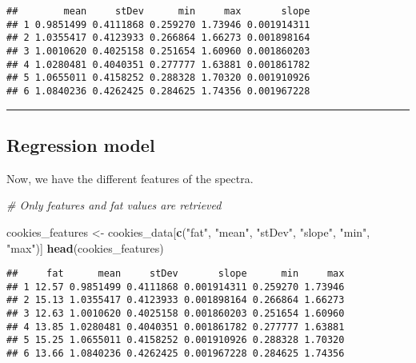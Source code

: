 \documentclass[
]{article}
\newenvironment{Shaded}{\begin{snugshade}}{\end{snugshade}}
\newcommand{\CommentTok}[1]{\textcolor[rgb]{0.56,0.35,0.01}{\textit{#1}}}
\newcommand{\DecValTok}[1]{\textcolor[rgb]{0.00,0.00,0.81}{#1}}
\newcommand{\FunctionTok}[1]{\textcolor[rgb]{0.13,0.29,0.53}{\textbf{#1}}}
\newcommand{\NormalTok}[1]{#1}
\newcommand{\OtherTok}[1]{\textcolor[rgb]{0.56,0.35,0.01}{#1}}
\newcommand{\SpecialCharTok}[1]{\textcolor[rgb]{0.81,0.36,0.00}{\textbf{#1}}}
\newcommand{\StringTok}[1]{\textcolor[rgb]{0.31,0.60,0.02}{#1}}
\begin{document}
\begin{verbatim}
##        mean     stDev      min     max       slope
## 1 0.9851499 0.4111868 0.259270 1.73946 0.001914311
## 2 1.0355417 0.4123933 0.266864 1.66273 0.001898164
## 3 1.0010620 0.4025158 0.251654 1.60960 0.001860203
## 4 1.0280481 0.4040351 0.277777 1.63881 0.001861782
## 5 1.0655011 0.4158252 0.288328 1.70320 0.001910926
## 6 1.0840236 0.4262425 0.284625 1.74356 0.001967228
\end{verbatim}

\begin{center}\rule{0.5\linewidth}{0.5pt}\end{center}

\subsection{Regression model}\label{regression-model}

Now, we have the different features of the spectra.

\begin{Shaded}
\begin{Highlighting}[]
\CommentTok{\# Only features and fat values are retrieved}

\NormalTok{cookies\_features }\OtherTok{\textless{}{-}}\NormalTok{ cookies\_data[}\FunctionTok{c}\NormalTok{(}\StringTok{"fat"}\NormalTok{, }\StringTok{"mean"}\NormalTok{, }\StringTok{"stDev"}\NormalTok{, }\StringTok{"slope"}\NormalTok{, }\StringTok{"min"}\NormalTok{, }\StringTok{"max"}\NormalTok{)]}
\FunctionTok{head}\NormalTok{(cookies\_features)}
\end{Highlighting}
\end{Shaded}

\begin{verbatim}
##     fat      mean     stDev       slope      min     max
## 1 12.57 0.9851499 0.4111868 0.001914311 0.259270 1.73946
## 2 15.13 1.0355417 0.4123933 0.001898164 0.266864 1.66273
## 3 12.63 1.0010620 0.4025158 0.001860203 0.251654 1.60960
## 4 13.85 1.0280481 0.4040351 0.001861782 0.277777 1.63881
## 5 15.25 1.0655011 0.4158252 0.001910926 0.288328 1.70320
## 6 13.66 1.0840236 0.4262425 0.001967228 0.284625 1.74356
\end{verbatim}

\begin{Shaded}
\end{Shaded}
\end{document}
